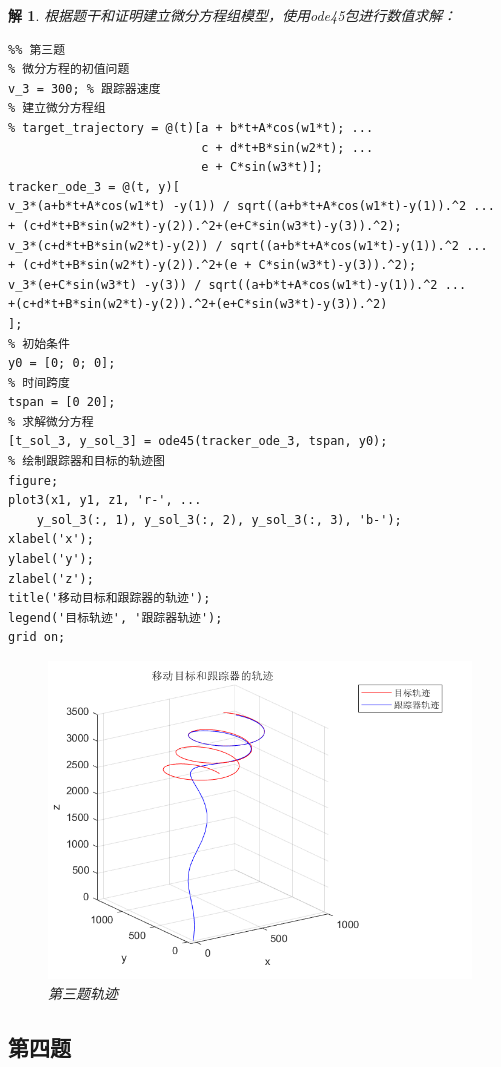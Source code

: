 \documentclass[a4paper, 12pt]{ctexart}
\newtheorem*{theorem}{解}
\begin{document}
\begin{theorem}
    根据题干和证明建立微分方程组模型，使用ode45包进行数值求解：
\begin{lstlisting}
%% 第三题
% 微分方程的初值问题
v_3 = 300; % 跟踪器速度
% 建立微分方程组
% target_trajectory = @(t)[a + b*t+A*cos(w1*t); ...
                           c + d*t+B*sin(w2*t); ...
                           e + C*sin(w3*t)];
tracker_ode_3 = @(t, y)[
v_3*(a+b*t+A*cos(w1*t) -y(1)) / sqrt((a+b*t+A*cos(w1*t)-y(1)).^2 ...
+ (c+d*t+B*sin(w2*t)-y(2)).^2+(e+C*sin(w3*t)-y(3)).^2);
v_3*(c+d*t+B*sin(w2*t)-y(2)) / sqrt((a+b*t+A*cos(w1*t)-y(1)).^2 ...
+ (c+d*t+B*sin(w2*t)-y(2)).^2+(e + C*sin(w3*t)-y(3)).^2);
v_3*(e+C*sin(w3*t) -y(3)) / sqrt((a+b*t+A*cos(w1*t)-y(1)).^2 ...
+(c+d*t+B*sin(w2*t)-y(2)).^2+(e+C*sin(w3*t)-y(3)).^2)
];
% 初始条件
y0 = [0; 0; 0];
% 时间跨度
tspan = [0 20];
% 求解微分方程
[t_sol_3, y_sol_3] = ode45(tracker_ode_3, tspan, y0);
% 绘制跟踪器和目标的轨迹图
figure;
plot3(x1, y1, z1, 'r-', ...
    y_sol_3(:, 1), y_sol_3(:, 2), y_sol_3(:, 3), 'b-');
xlabel('x');
ylabel('y');
zlabel('z');
title('移动目标和跟踪器的轨迹');
legend('目标轨迹', '跟踪器轨迹');
grid on;
\end{lstlisting}
\begin{figure}[h]
    \centering
    \includegraphics[width=4.5in]{pic/t3.png}
    \caption*{第三题轨迹}
\end{figure}

\end{theorem}







\subsection{第四题}
\end{document}
